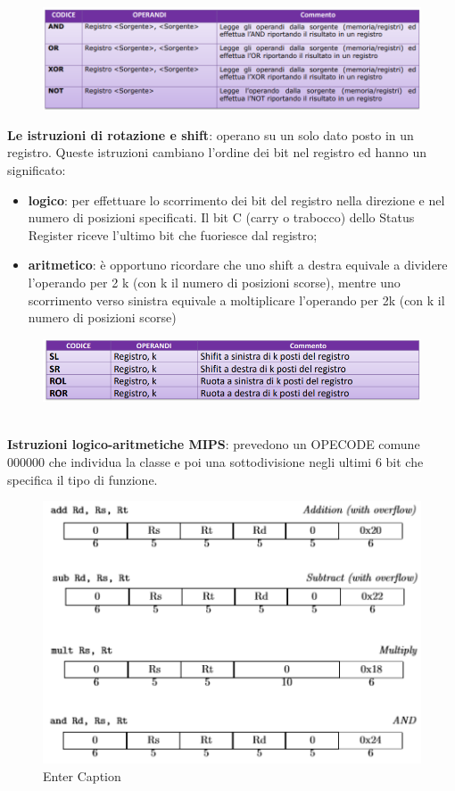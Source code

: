\documentclass[12pt]{article}
\begin{document}
\begin{figure}[h]
    \centering
    \includegraphics[width=1\linewidth]{operazioni logiche.png}
\end{figure}
\newpage
\noindent \textbf{Le istruzioni di rotazione e shift}: operano su un solo dato posto in un registro. Queste istruzioni cambiano l’ordine dei bit nel registro ed hanno un significato: 
\begin{itemize}
    \item \textbf{logico}: per effettuare lo scorrimento dei bit del registro nella direzione e nel numero di posizioni specificati. Il bit C (carry o trabocco) dello Status Register riceve l’ultimo bit che fuoriesce dal registro; 
    \item \textbf{aritmetico}: è opportuno ricordare che uno shift a destra equivale a dividere l’operando per 2 k (con k il numero di posizioni scorse), mentre uno scorrimento verso sinistra equivale a moltiplicare l’operando per 2k (con k il numero di posizioni scorse)
\end{itemize}
\begin{figure}[h]
    \centering
    \includegraphics[width=1\linewidth]{shitf e rotazione.png}
\end{figure} 
\par\maketitle\noindent \\ 
\textbf{Istruzioni logico-aritmetiche MIPS}: prevedono un OPECODE comune 000000 che individua la classe e poi una sottodivisione negli ultimi 6 bit che specifica il tipo di funzione.
\begin{figure}[h]
    \centering
    \includegraphics[width=0.75\linewidth]{opecode.png}
    \caption{Enter Caption}
    \label{fig:enter-label}
\end{figure}
\end{document}
